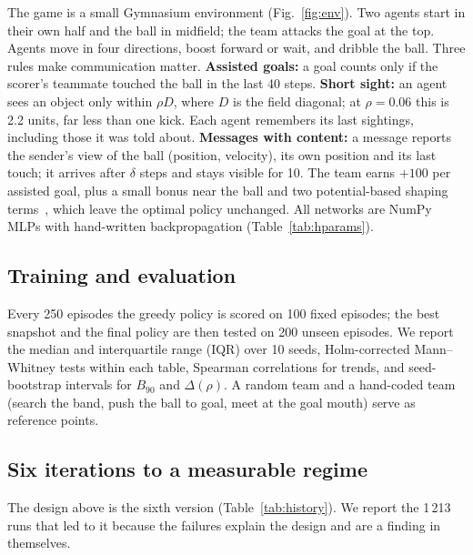 \documentclass[twocolumn]{article}
\begin{document}
The game is a small Gymnasium environment (Fig.~\ref{fig:env}). Two agents start in their own half and
the ball in midfield; the team attacks the goal at the top. Agents move in four directions, boost
forward or wait, and dribble the ball. Three rules make communication matter. \textbf{Assisted goals:}
a goal counts only if the scorer's teammate touched the ball in the last 40 steps. \textbf{Short
sight:} an agent sees an object only within $\rho D$, where $D$ is the field diagonal; at $\rho=0.06$
this is 2.2 units, far less than one kick. Each agent remembers its last sightings, including those it
was told about. \textbf{Messages with content:} a message reports the sender's view of the ball
(position, velocity), its own position and its last touch; it arrives after $\delta$ steps and stays
visible for 10. The team earns $+100$ per assisted goal, plus a small bonus near the ball and two
potential-based shaping terms~\citep{ng1999}, which leave the optimal policy unchanged. All networks
are NumPy MLPs with hand-written backpropagation (Table~\ref{tab:hparams}).

\subsection{Training and evaluation}

Every 250 episodes the greedy policy is scored on 100 fixed episodes; the best snapshot and the final
policy are then tested on 200 unseen episodes. We report the median and interquartile range (IQR) over
10 seeds, Holm-corrected Mann--Whitney tests within each table, Spearman correlations for trends, and
seed-bootstrap intervals for $B_{90}$ and $\Delta(\rho)$. A random team and a hand-coded team (search
the band, push the ball to goal, meet at the goal mouth) serve as reference points.

\subsection{Six iterations to a measurable regime}\label{sec:history}

The design above is the sixth version (Table~\ref{tab:history}). We report the 1\,213 runs that led to
it because the failures explain the design and are a finding in themselves.
\end{document}
